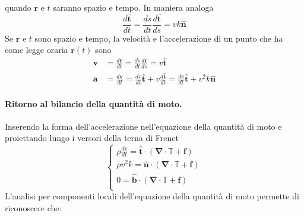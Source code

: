  quando $\bm{r}$ e $t$ saranno spazio e tempo.
In maniera analoga
\begin{equation}
 \frac{d\bm{\hat{t}}}{dt} = \frac{ds}{dt}\frac{d\bm{\hat{t}}}{ds} = 
  v k \bm{\hat{n}}
\end{equation}
Se $\bm{r}$ e $t$ sono spazio e tempo, la velocità e l'accelerazione di un
 punto che ha come legge oraria $\bm{r}(t)$ sono
\begin{equation}
 \begin{aligned}
  \bm{v} & = \frac{d\bm{r}}{dt} = \frac{ds}{dt}\frac{d\bm{r}}{ds} = 
    v \bm{\hat{t}} \\
  \bm{a} & = \frac{d\bm{v}}{dt} =
   \frac{dv}{dt} \bm{\hat{t}} + v \frac{d\bm{\hat{t}}}{dt} =
   \frac{dv}{dt} \bm{\hat{t}} + v^2 k \bm{\hat{n}}
 \end{aligned}
\end{equation}
%
\begin{minipage}{0.60\textwidth}
\paragraph{Ritorno al bilancio della quantità di moto.} Inserendo la
 forma dell'accelerazione nell'equazione della quantità di moto e 
 proiettando lungo i versori della terna di Frenet
\begin{equation}
 \begin{cases}
  \rho \frac{dv}{dt} =  \bm{\hat{t}} \cdot \left(
     \bm{\nabla} \cdot \mathbb{T} + \bm{f} \right) \\
  \rho v^2 k = \bm{\hat{n}} \cdot \left(
     \bm{\nabla} \cdot \mathbb{T} + \bm{f} \right) \\
  0 = \bm{\hat{b}} \cdot \left(
     \bm{\nabla} \cdot \mathbb{T} + \bm{f} \right) \\
 \end{cases}
\end{equation}
L'analisi per componenti locali dell'equazione della quantità di moto permette di riconoscere che:
\end{minipage}
\hfill
